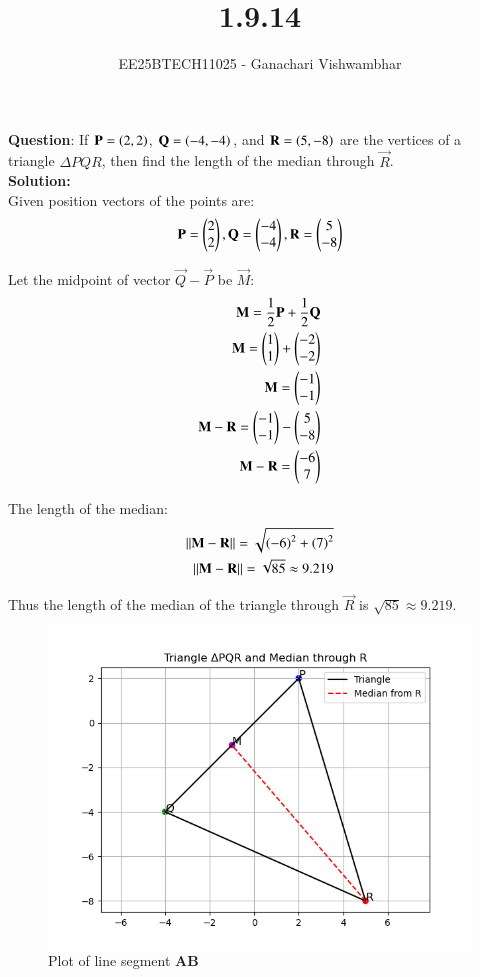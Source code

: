 \documentclass[journal]{IEEEtran}
\begin{document}
\title{1.9.14}
\author{EE25BTECH11025 - Ganachari Vishwambhar}
\maketitle

\textbf{Question}:\newline
If $\vec{P}=\brak{2,2}$, $\vec{Q}=\brak{-4,-4}$, and $\vec{R}=\brak{5,-8}$ are the vertices of a triangle $\Delta PQR$, then find the length of the median through $\vec{R}$.\\
\textbf{Solution: }\\
Given position vectors of the points are:
\begin{align}
    \vec{P}=\myvec{2\\2},
    \vec{Q}=\myvec{-4\\-4},
    \vec{R}=\myvec{5\\-8}
\end{align}

Let the midpoint of vector $\vec{Q}-\vec{P}$ be $\vec{M}$:
\begin{align}
    \vec{M}=\frac{1}{2}\vec{P}+\frac{1}{2}\vec{Q}\\
    \vec{M}=\myvec{1\\1}+\myvec{-2\\-2}\\
    \vec{M}=\myvec{-1\\-1}\\
    \vec{M}-\vec{R}=\myvec{-1\\-1}-\myvec{5\\-8}\\
    \vec{M}-\vec{R}=\myvec{-6\\7}
\end{align}

The length of the median:
\begin{align}
    ||\vec{M}-\vec{R}||=\sqrt{\brak{-6}^2+\brak{7}^2}\\
    ||\vec{M}-\vec{R}||=\sqrt{85}\approx9.219
\end{align}

Thus the length of the median of the triangle through $\vec{R}$ is $\sqrt{85}\approx9.219$.

\begin{figure}[h!]
   \centering
   \includegraphics[width=0.7\linewidth]{figs/plot.png}
   \caption{Plot of line segment \textbf{AB}}
   \label{}
\end{figure}
\end{document}
